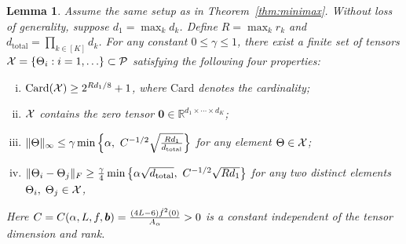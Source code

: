 \documentclass[11pt]{article}
\theoremstyle{plain}
\newtheorem{lem}{Lemma}
\theoremstyle{definition}
\begin{document}
\begin{lem}\label{lem:construction}
Assume the same setup as in Theorem~\ref{thm:minimax}. Without loss of generality, suppose $d_1=\max_kd_k$. Define $R=\max_k r_k$ and $d_{\text{total}}=\prod_{k\in[K]} d_k$. For any constant $0\leq \gamma \leq 1$, there exist a finite set of tensors $\mathcal{X}=\{\Theta_i: i=1,\ldots\}\subset \mathcal{P}$ satisfying the following four properties:
 \begin{enumerate} [(i)]
\item $\text{Card}(\mathcal{X})\geq 2^{Rd_1/8}+1$, where $\text{Card}$ denotes the cardinality;
\item $\mathcal{X}$ contains the zero tensor $\mathbf{0}\in\mathbb{R}^{d_1\times \cdots\times d_K}$;
\item $\lVert\Theta\rVert_\infty\leq \gamma \min\left\{ \alpha ,\ C^{-1/2}\sqrt{Rd_1\over d_{\text{total}}} \right\} $ for any element $\Theta\in\mathcal{X}$;
\item $\FnormSize{}{\Theta_i-\Theta_j}\geq {\gamma\over 4} \min\left\{ \alpha\sqrt{d_{\text{total}}},\ C^{-1/2}\sqrt{Rd_1}\right\}$ for any two distinct elements $\Theta_i,\; \Theta_j\in\mathcal{X}$,
 \end{enumerate} 
Here $C=C(\alpha,L,f,\bm{b})={(4L-6)\dot{f}^2(0)\over A_\alpha }>0$ is a constant independent of the tensor dimension and rank.
\end{lem}
\end{document}
